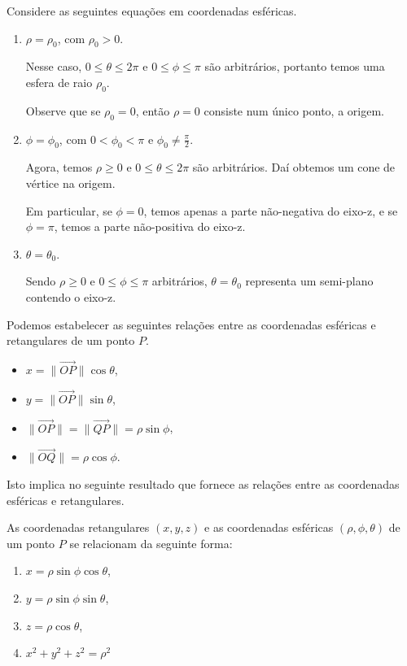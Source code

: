\begin{example}
    Considere as seguintes equações em coordenadas esféricas.

        \begin{enumerate}
            \item \(\rho = \rho_0\), com \(\rho_0 > 0\).
            
                Nesse caso, \(0\leq \theta\leq 2\pi\) e \(0\leq \phi\leq \pi\) são arbitrários, portanto temos uma esfera de raio \(\rho_0\).

                Observe que se \(\rho_0 = 0\), então \(\rho = 0\) consiste num único ponto, a origem.

            \item \(\phi = \phi_0\), com \(0<\phi_0<\pi\) e \(\phi_0 \neq \frac{\pi}{2}\).
            
                Agora, temos \(\rho \geq 0\) e \(0 \leq \theta \leq 2\pi\) são arbitrários. Daí obtemos um cone de vértice na origem.

                Em particular, se \(\phi = 0\), temos apenas a parte não-negativa do eixo-z, e se \(\phi = \pi\), temos a parte não-positiva do eixo-z. %

            \item \(\theta = \theta_0\).
            
                Sendo \(\rho \geq 0\) e \(0\leq \phi \leq \pi\) arbitrários, \(\theta = \theta_0\) representa um semi-plano contendo o eixo-z.
        \end{enumerate}
\end{example}

Podemos estabelecer as seguintes relações entre as coordenadas esféricas e retangulares de um ponto \(P\).
    \begin{itemize}
        \item \(x = \|\overrightarrow{OP}\| \cos\theta\),
        \item \(y = \|\overrightarrow{OP}\| \sin\theta\),
        \item \(\|\overrightarrow{OP}\| = \|\overrightarrow{QP}\| = \rho\sin\phi\),
        \item \(\|\overrightarrow{OQ}\| = \rho\cos\phi\).
    \end{itemize}

Isto implica no seguinte resultado que fornece as relações entre as coordenadas esféricas e retangulares.
\begin{theorem}
    As coordenadas retangulares \((x,y,z)\) e as coordenadas esféricas \((\rho,\phi,\theta)\) de um ponto \(P\) se relacionam da seguinte forma:
        \begin{enumerate}
            \item \(x = \rho \sin\phi \cos\theta\),
            \item \(y = \rho \sin\phi \sin\theta\),
            \item \(z = \rho \cos\theta\),
            \item \(x^2 + y^2 + z^2 = \rho^2\)
        \end{enumerate}
\end{theorem}

